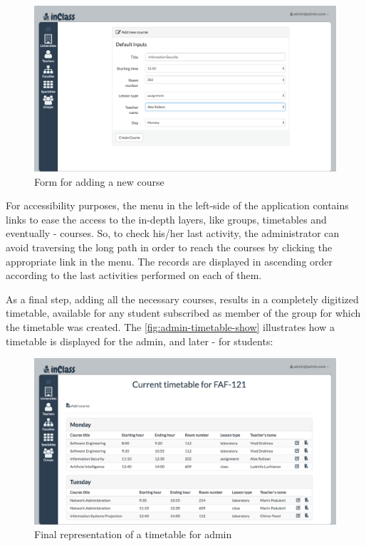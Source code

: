 \begin{figure}[H]
\centering
\includegraphics[width=14cm]{Chapter3/admin-course-add.png}
\caption{Form for adding a new course}
\label{fig:admin-course-add}
\end{figure}

For accessibility purposes, the menu in the left-side of the application contains links to ease the access to the in-depth layers, like groups, timetables and eventually - courses. So, to check his/her last activity, the administrator can avoid traversing the long path in order to reach the courses by clicking the appropriate link in the menu. The records are displayed in ascending order according to the last activities performed on each of them.
 
As a final step, adding all the necessary courses, results in a completely digitized timetable, available for any student subscribed as member of the group for which the timetable was created. The \autoref{fig:admin-timetable-show} illustrates how a timetable is displayed for the admin, and later - for students:

\begin{figure}[H]
\centering
\includegraphics[width=14cm]{Chapter3/admin-timetable-show.png}
\caption{Final representation of a timetable for admin}
\label{fig:admin-timetable-show}
\end{figure}

